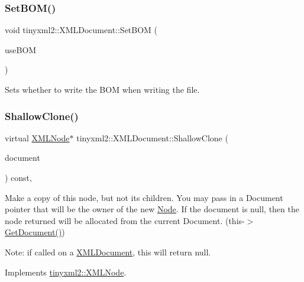 \subsubsection{\texorpdfstring{Set\+B\+O\+M()}{SetBOM()}\hspace{0.1cm}{\footnotesize\ttfamily [2/2]}}
{\footnotesize\ttfamily void tinyxml2\+::\+X\+M\+L\+Document\+::\+Set\+B\+OM (\begin{DoxyParamCaption}\item[{bool}]{use\+B\+OM }\end{DoxyParamCaption})\hspace{0.3cm}{\ttfamily [inline]}}

Sets whether to write the B\+OM when writing the file. \mbox{\label{classtinyxml2_1_1XMLDocument_aa37cc1709d7e1e988bc17dcfb24a69b8}} 
\subsubsection{\texorpdfstring{Shallow\+Clone()}{ShallowClone()}\hspace{0.1cm}{\footnotesize\ttfamily [1/2]}}
{\footnotesize\ttfamily virtual \hyperlink{classtinyxml2_1_1XMLNode}{X\+M\+L\+Node}$\ast$ tinyxml2\+::\+X\+M\+L\+Document\+::\+Shallow\+Clone (\begin{DoxyParamCaption}\item[{\hyperlink{classtinyxml2_1_1XMLDocument}{X\+M\+L\+Document} $\ast$}]{document }\end{DoxyParamCaption}) const\hspace{0.3cm}{\ttfamily [inline]}, {\ttfamily [virtual]}}

Make a copy of this node, but not its children. You may pass in a Document pointer that will be the owner of the new \hyperlink{classNode}{Node}. If the \textquotesingle{}document\textquotesingle{} is null, then the node returned will be allocated from the current Document. (this-\/$>$\hyperlink{classtinyxml2_1_1XMLNode_af343d1ef0b45c0020e62d784d7e67a68}{Get\+Document()})

Note\+: if called on a \hyperlink{classtinyxml2_1_1XMLDocument}{X\+M\+L\+Document}, this will return null. 

Implements \hyperlink{classtinyxml2_1_1XMLNode_a8402cbd3129d20e9e6024bbcc0531283}{tinyxml2\+::\+X\+M\+L\+Node}.

